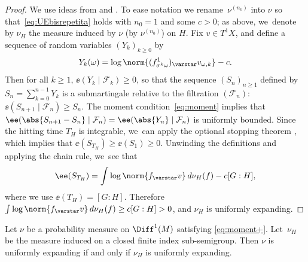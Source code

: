 \begin{proof} We use ideas from \cite[\S 4.3]{liu_thesis} and \cite[Prop.\,2.2]{chung}.
To ease notation we rename~$\nu^{(n_0)}$ into $\nu$ so that~\eqref{eq:UEbisrepetita} holds with $n_0= 1$ and some $c>0$; as above, we~denote by $\nu_H$ the measure induced by $\nu$ (\ie by $\nu^{(n_0)}$) on $H$. Fix
$ v\in T^1X$, and
define a sequence of random variables $(Y_k)_{k\geq 0}$ by
\begin{equation*}
Y_k(\omega) = \log\norm{ (f^1_{\sigma^k\omega})_\varstar v_{\omega, k}}- c.
\end{equation*}
Then for all $k\geq 1$,
$\ee({Y_{k}\mid \mathcal F_{k}})\geq 0$, so that the sequence $(S_n)_{n\geq 1}$
defined by $ S_n = \sum_{k=0}^{n-1} Y_k$ is a submartingale
relative to the filtration $(\mathcal F_n)$: $\ee( S_{n+1}\mid \mathcal F_n)\geq S_{n}$.
The moment condition~\eqref{eq:moment} implies that
$\ee(\abs{S_{n+1}-S_n}\mid \mathcal F_n) = \ee(\abs{Y_n}\mid \mathcal F_n)$ is uniformly bounded.
Since the hitting time $T_H$ is integrable, we~can apply the optional stopping theorem \cite[Th.\,4.7.5]{durrett_book}, which implies that
$\ee(S_{T_H})\geq \ee(S_1)\geq 0$. Unwinding the definitions and applying the chain rule, we~see that
\begin{equation*}
\ee(S_{T_H}) = \int \log \norm{ f_\varstar v}\, d\nu_H(f) - c [G:H],
\end{equation*}
where we use $\ee (T_H) = [G:H]$. Therefore
$\int \log \norm{f_\varstar v}\, d\nu_H(f) \geq c [G:H]>0$, and
$\nu_H$ is uniformly expanding.
\end{proof}

\begin{pro}\label{pro:induced_UE2}
Let $\nu$ be a probability measure on $\Diff^1(M)$ satisfying \eqref{eq:moment+}. Let~$\nu_H$ be the measure induced on a closed
finite index sub-semigroup. Then $\nu$ is uniformly expanding if and only if $\nu_H$ is uniformly expanding.
\end{pro}

